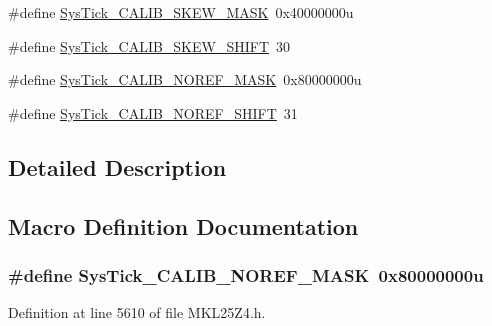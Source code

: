 \begin{DoxyCompactItemize}
$$\item 
\#define \hyperlink{group___sys_tick___register___masks_gaade570cf5b9c0a8da6e1215de8db8d82}{Sys\+Tick\+\_\+\+C\+A\+L\+I\+B\+\_\+\+S\+K\+E\+W\+\_\+\+M\+A\+SK}~0x40000000u
\item 
\#define \hyperlink{group___sys_tick___register___masks_ga12bc3aae96690bf88f38e0bf46aa3d8b}{Sys\+Tick\+\_\+\+C\+A\+L\+I\+B\+\_\+\+S\+K\+E\+W\+\_\+\+S\+H\+I\+FT}~30
\item 
\#define \hyperlink{group___sys_tick___register___masks_gabca0ac6719f78220d81d2fc1328d5a45}{Sys\+Tick\+\_\+\+C\+A\+L\+I\+B\+\_\+\+N\+O\+R\+E\+F\+\_\+\+M\+A\+SK}~0x80000000u
\item 
\#define \hyperlink{group___sys_tick___register___masks_ga957057ddf04b20227820b1343b08a302}{Sys\+Tick\+\_\+\+C\+A\+L\+I\+B\+\_\+\+N\+O\+R\+E\+F\+\_\+\+S\+H\+I\+FT}~31
\end{DoxyCompactItemize}


\subsection{Detailed Description}


\subsection{Macro Definition Documentation}
\subsubsection[{\texorpdfstring{Sys\+Tick\+\_\+\+C\+A\+L\+I\+B\+\_\+\+N\+O\+R\+E\+F\+\_\+\+M\+A\+SK}{SysTick_CALIB_NOREF_MASK}}]{\setlength{\rightskip}{0pt plus 5cm}\#define Sys\+Tick\+\_\+\+C\+A\+L\+I\+B\+\_\+\+N\+O\+R\+E\+F\+\_\+\+M\+A\+SK~0x80000000u}\hypertarget{group___sys_tick___register___masks_gabca0ac6719f78220d81d2fc1328d5a45}{}\label{group___sys_tick___register___masks_gabca0ac6719f78220d81d2fc1328d5a45}


Definition at line 5610 of file M\+K\+L25\+Z4.\+h.

